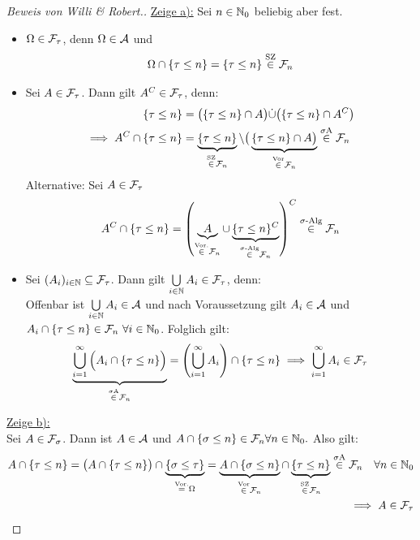 \documentclass[12pt,a4paper]{article}
\begin{document}
\begin{proof}[Beweis von Willi \& Robert.]\enter
\underline{Zeige a):} Sei $n\in\mathbb{N}_0$ beliebig aber fest.
\begin{itemize} 
\item $\Omega\in\mathcal{F}_\tau$, denn $\Omega\in\mathcal{A}$ und 
\begin{align*}
\Omega\cap\lbrace\tau\leq n\rbrace=\lbrace\tau\leq n\rbrace \stackrel{\text{SZ}}{\in} \mathcal{F}_n
\end{align*}
\item Sei $A \in \mathcal{F}_\tau$. Dann gilt $A^C \in \mathcal{F}_\tau$, denn:\\
\begin{align*}
\lbrace\tau\leq n\rbrace &=\big(\lbrace\tau\leq n\rbrace\cap A\big)\dot{\cup}\big(\lbrace\tau\leq n\rbrace\cap A^C\big)\\
\implies A^C\cap\lbrace\tau\leq n\rbrace&=\underbrace{\lbrace\tau\leq n\rbrace}_{\stackrel{\text{SZ}}{\in}\mathcal{F}_n}\setminus\big(\underbrace{\lbrace\tau\leq n\rbrace\cap A\big)}_{\stackrel{\text{Vor}}{\in}\mathcal{F}_n}\stackrel{\sigma\text{A}}{\in}\mathcal{F}_n
\end{align*}
Alternative: Sei $A \in \mathcal{F}_\tau$
\begin{align*}
	A^C\cap \lbrace \tau \leq n \rbrace = \left(\underbrace{A}_{\stackrel{\text{Vor.}}{\in} \mathcal{F}_n} \cup \underbrace{\lbrace \tau \leq n \rbrace^C}_{\stackrel{\sigma\text{-Alg}}{\in} \mathcal{F}_n} \right)^C \stackrel{\sigma\text{-Alg}}{\in}\mathcal{F}_n
\end{align*}

\item Sei $(A_i)_{i\in\mathbb{N}}\subseteq\mathcal{F}_\tau$. Dann gilt $\bigcup\limits_{i\in\mathbb{N}} A_i  \in \mathcal{F}_\tau$, denn:\\
Offenbar ist $\bigcup\limits_{i\in\mathbb{N}} A_i  \in\mathcal{A}$ und nach Voraussetzung gilt $A_i\in\mathcal{A}$ und\\ $A_i\cap\lbrace\tau\leq n\rbrace\in\mathcal{F}_n~\forall i\in\mathbb{N}_0$. Folglich gilt:
\begin{align*}
\underbrace{\bigcup\limits_{i=1}^{\infty} \Big (A_i \cap \{\tau \leq n\} \Big )}_{\stackrel{\sigma\text{A}}{\in} \mathcal{F}_n} = \left( \bigcup\limits_{i=1}^{\infty} A_i \right)\cap \{\tau \leq n\} \implies  \bigcup\limits_{i=1}^{\infty} A_i \in \mathcal{F}_\tau
\end{align*}
\end{itemize}

\underline{Zeige b):}\\
Sei $A\in\mathcal{F}_\sigma$. Dann ist $A\in\mathcal{A}$ und $A\cap\lbrace\sigma\leq n\rbrace\in\mathcal{F}_n\forall n\in\mathbb{N}_0.$ Also gilt:
\begin{align*}
A \cap \lbrace\tau \leq n\rbrace
\stackrel{}{=}
\big(A \cap\lbrace\tau \leq n\rbrace\big)\cap\underbrace{\lbrace\sigma\leq\tau\rbrace}_{\stackrel{\text{Vor.}}{=}\Omega}
=\underbrace{A\cap\lbrace\sigma\leq n\rbrace}_{\stackrel{\text{Vor}}{\in}\mathcal{F}_n}\cap\underbrace{\lbrace\tau\leq n\rbrace}_{\stackrel{\text{SZ}}{\in}\mathcal{F}_n} \stackrel{\sigma\text{A}}{\in} \mathcal{F}_n \quad \forall n \in \mathbb{N}_0\\
\implies A\in\mathcal{F}_\tau
\end{align*}


\end{proof}
\end{document}
